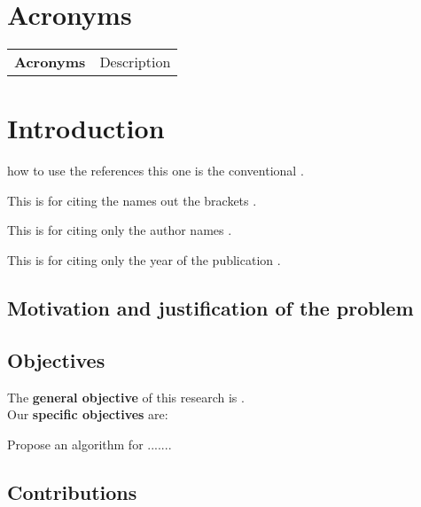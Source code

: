 \documentclass[letterpaper, twoside, openright, 12pt]{book}%
\begin{document}
\tableofcontents
\setcounter{tocdepth}{2}
\listoffigures
{}
\listoftables
{}

\chapter*{Acronyms} 
\begin{longtable}{>{\bfseries}p{3cm}p{11cm}}
Acronyms & Description \\

\end{longtable}

\mainmatter


\chapter{Introduction} \label{chap:Introduction}
how to use the references this one is the conventional \citep{Loyola2016}.

This is for citing the names out the brackets \cite{Loyola2016}.

This is for citing only the author names \citeauthor{Loyola2016}.

This is for citing only the year of the publication \citeyear{Loyola2016}.



\section{Motivation and justification of the problem}

\section{Objectives}
The \textbf{general objective} of this research is .\\

Our \textbf{specific objectives} are:

\begin{enumerate}[1.]
{
 \item Propose an algorithm for .......
}
\end{enumerate}

\section{Contributions}
\end{document}
